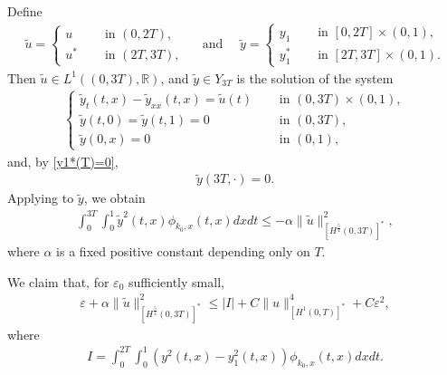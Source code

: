 \documentclass[11pt, reqno]{amsart}
\newcommand{\ty}{\widetilde{y}}
\newcommand{\tu}{\widetilde{u}}
\theoremstyle{plain}
\numberwithin{equation}{section}
\newcommand{\mR}{\mathbb{R}}
\begin{document}
		Define 
		\begin{align}	\label{def-tildeu} %
			\tu = \begin{cases}
				u	 \quad 	&\text{ in } (0, 2T), \\[6pt]
				u^* \quad &\text{ in } (2T, 3T),
			\end{cases}		\quad \mbox{ and } \quad
			\ty = \begin{cases}
				y_1 \quad &\text{ in } [0, 2T] \times (0, 1), \\[6pt]
				y_1^* \quad &\text{ in } [2T, 3T] \times (0, 1).
			\end{cases}
		\end{align}		        
        Then $\tu \in L^1((0, 3T), \mR)$, and $\ty \in Y_{3T}$ is the solution of the system        
        \begin{align}	\label{tildey-1}
        \begin{cases}
            \ty_t (t, x) - \ty_{xx} (t, x)  = \tu(t) \quad &\text{ in } (0, 3T) \times (0, 1), \\[6pt]
            \ty(t, 0) = \ty(t, 1) = 0 &\text{ in } (0, 3T), \\[6pt]
            \ty(0, x) = 0 &\text{ in } (0, 1),
        \end{cases}
        \end{align}
     and, by \eqref{y1*(T)=0}, 
		\begin{align}        	
        	\ty(3T, \cdot) = 0.
		\end{align}				        	
        	 Applying  to $\ty$, we obtain
        \begin{align} 	\label{applyProp2.1}
            \int_{0}^{3T} \int_0^1 \ty^2(t, x) \phi_{k_0, x}(t, x) dx dt \leq - \alpha \|\tu \|^2_{[H^{\frac{5}{4}}(0, 3T)]^*},
        \end{align}
        where $\alpha$ is a fixed positive constant depending only on $T$.

\medskip

We claim that, for $\varepsilon_0$ sufficiently small, 
\begin{align}	\label{step4-claim}
	\varepsilon + \alpha \| \tu \|^2_{[H^{\frac{5}{4}}(0, 3T)]^*} \leq 	| I | + C\|u\|_{[H^1(0, T)]^*}^4 + C \varepsilon^2,  
\end{align}
where
\begin{align} \label{step4-I}
I  = \int_0^{2T} \int_0^1 \left(y^2(t, x) - y_1^2(t, x)\right) \phi_{k_0, x}(t, x) dx dt. 
\end{align}
\end{document}
